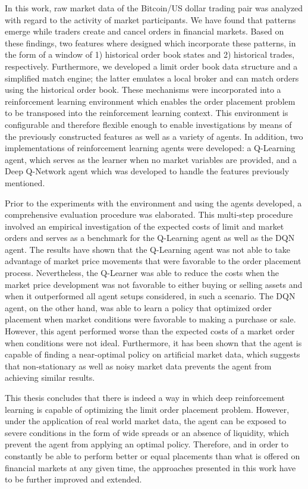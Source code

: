 In this work, raw market data of the Bitcoin/US dollar trading pair was analyzed with regard to the activity of market participants.
We have found that patterns emerge while traders create and cancel orders in financial markets.
Based on these findings, two features where designed which incorporate these patterns, in the form of a window of 1) historical order book states and 2) historical trades, respectively.
Furthermore, we developed a limit order book data structure and a simplified match engine; the latter  emulates a local broker and can match orders using the historical order book.
These mechanisms were incorporated into a reinforcement learning environment which enables the order placement problem to be transposed into the reinforcement learning context.
This environment is configurable and therefore flexible enough to enable investigations by means of the previously constructed features as well as a variety of agents.
In addition, two implementations of reinforcement learning agents were developed: a Q-Learning agent, which serves as the learner when no market variables are provided, and a Deep Q-Network agent which was developed to handle the features previously mentioned.

Prior to the experiments with the environment and using the agents developed, a comprehensive evaluation procedure was elaborated.
This multi-step procedure involved an empirical investigation of the expected costs of limit and market orders and serves as a benchmark for the Q-Learning agent as well as the DQN agent.
The results have shown that the Q-Learning agent was not able to take advantage of market price movements that were favorable to the order placement process.
Nevertheless, the Q-Learner was able to reduce the costs when the market price development was not favorable to either buying or selling assets and when it outperformed all agent setups considered, in such a scenario.
The DQN agent, on the other hand, was able to learn a policy that optimized order placement when market conditions were favorable to making a purchase or sale.
However, this agent performed worse than the expected costs of a market order when conditions were not ideal.
Furthermore, it has been shown that the agent is capable of finding a near-optimal policy on artificial market data, which suggests that non-stationary as well as noisy market data prevents the agent from achieving similar results.

This thesis concludes that there is indeed a way in which deep reinforcement learning is capable of optimizing the limit order placement problem.
However, under the application of real world market data, the agent can be exposed to severe conditions in the form of wide spreads or an absence of liquidity, which prevent the agent from applying an optimal policy.
Therefore, and in order to constantly be able to perform better or equal placements than what is offered on financial markets at any given time, the approaches presented in this work have to be further improved and extended.

